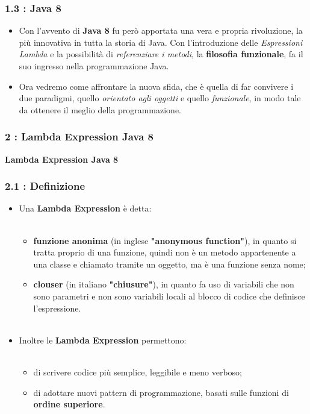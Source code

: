 \documentclass{beamer}
\begin{document}

\begin{frame}
	\frametitle{\textbf{1.3 : Java 8}}
	\begin{itemize}
		\item
			Con l'avvento di \textbf{Java 8} fu però apportata una vera e propria rivoluzione, la più innovativa in tutta la storia di Java. Con l'introduzione delle \textit{Espressioni Lambda} e la possibilità di \textit{referenziare i metodi}, la \textbf{filosofia funzionale}, fa il suo ingresso nella programmazione Java.
		\item
			Ora vedremo come affrontare la nuova sfida, che è quella di far convivere i due paradigmi, quello \textit{orientato agli oggetti} e quello \textit{funzionale}, in modo tale da ottenere il meglio della programmazione.				
	\end{itemize}
\end{frame}


\begin{frame}
	\frametitle{\textbf{2 : Lambda Expression Java 8}}
	\begin{center}
		\textbf{\Huge Lambda Expression Java 8}
	\end{center}
\end{frame}


\begin{frame}
	\frametitle{\textbf{2.1 : Definizione}}
	\begin{itemize}
			\item
				Una \textbf{Lambda Expression} è detta:\\\
				\begin{itemize}
					\item
						\textbf{funzione anonima} (in inglese \textbf{"anonymous function"}), in quanto si tratta proprio di una funzione, quindi non è un metodo appartenente a una classe e chiamato tramite un oggetto, ma è una funzione senza nome;
					\item
						\textbf{clouser} (in italiano \textbf{"chiusure"}), in quanto fa uso di variabili che non sono parametri e non sono variabili locali al blocco di codice che definisce l'espressione.\\\
				\end{itemize}
			\item
				Inoltre le \textbf{Lambda Expression} permettono:\\\
				\begin{itemize}
					\item
						di scrivere codice più semplice, leggibile e meno verboso;
					\item
						di adottare nuovi pattern di programmazione, basati sulle funzioni di \textbf{ordine superiore}.
				\end{itemize}				
	\end{itemize}
\end{frame}
\end{document}
